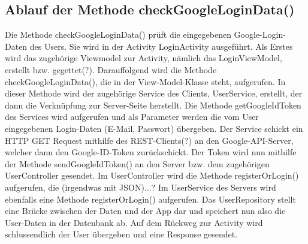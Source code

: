 \subsection{Ablauf der Methode checkGoogleLoginData()}

Die Methode checkGoogleLoginData() prüft die eingegebenen Google-Login-Daten des Users. Sie wird in der Activity LoginActivity ausgeführt. Als Erstes wird das zugehörige Viewmodel zur Activity, nämlich das LoginViewModel, erstellt bzw. gegettet(?). Darauffolgend wird die Methode checkGoogleLoginData(), die in der View-Model-Klasse steht, aufgerufen. In dieser Methode wird der zugehörige Service des Clients, UserService, erstellt, der dann die Verknüpfung zur Server-Seite herstellt. Die Methode getGoogleIdToken des Services wird aufgerufen und als Parameter werden die vom User eingegebenen Login-Daten (E-Mail, Passwort) übergeben. Der Service schickt ein HTTP GET Request mithilfe des REST-Clients(?) an den Google-API-Server, welcher dann den Google-ID-Token zurückschickt. Der Token wird nun mithilfe der Methode sendGoogleIdToken() an den Server bzw. dem zugehörigen UserController gesendet. Im UserController wird die Methode registerOrLogin() aufgerufen, die (irgendwas mit JSON)...? Im UserService des Servers wird ebenfalls eine Methode registerOrLogin() aufgerufen. Das UserRepository stellt eine Brücke zwischen der Daten und der App dar und speichert nun also die User-Daten in der Datenbank ab. Auf dem Rückweg zur Activity wird schlussendlich der User übergeben und eine Response gesendet.